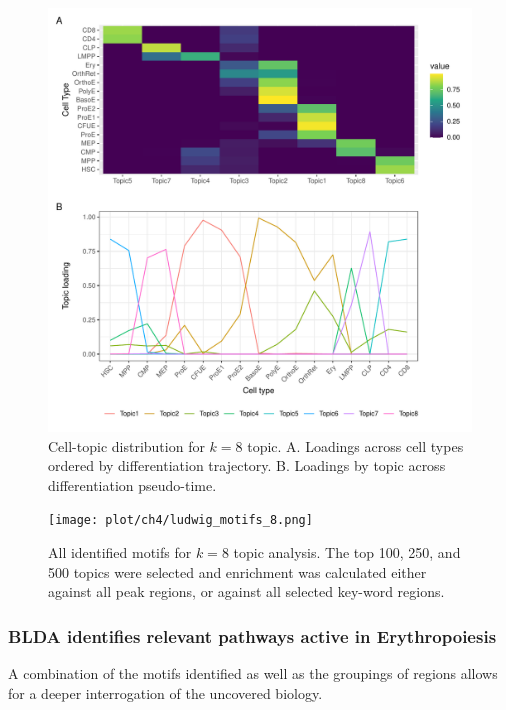 \begin{figure}
  \centering
  \includegraphics[width=\textwidth]{plot/ch4/ludwig_quick_topic_8.pdf}
  \caption{Cell-topic distribution for $k=8$ topic. A. Loadings across cell types ordered by differentiation trajectory. B. Loadings by topic across differentiation pseudo-time.}
  \label{fig:ludwig_8_topic}
\end{figure}

\begin{figure}
  \centering
  \texttt{[image: plot/ch4/ludwig\_motifs\_8.png]}
  \caption{All identified motifs for $k=8$ topic analysis. The top 100, 250, and 500 topics were selected and enrichment was calculated either against all peak regions, or against all selected key-word regions. }
  \label{fig:ludwig_motifs_8}
\end{figure}

\subsubsection{BLDA identifies relevant pathways active in Erythropoiesis}

A combination of the motifs identified as well as the groupings of regions allows for a deeper interrogation of the uncovered biology.

